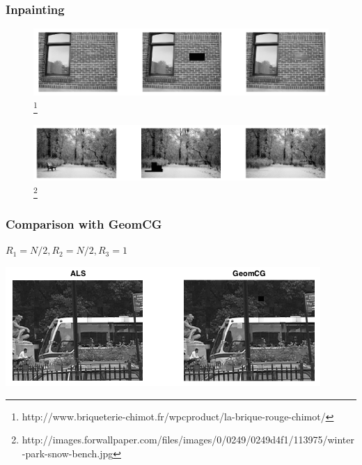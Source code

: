 \documentclass{beamer}
\begin{document}
\begin{frame}
\frametitle{Inpainting}
\begin{figure}
\includegraphics[width=1\linewidth]{InpaintingFacade.png}\footnote{\tiny{http://www.briqueterie-chimot.fr/wpcproduct/la-brique-rouge-chimot/}}
\end{figure}
\begin{figure}
\includegraphics[width=1\linewidth]{InpaintingSnow.png}\footnote{\tiny{http://images.forwallpaper.com/files/images/0/0249/0249d4f1/113975/winter-park-snow-bench.jpg}}
\end{figure}
\end{frame}

\begin{frame}
\frametitle{Comparison with GeomCG}
$R_1=N/2, R_2=N/2, R_3=1$\\
\begin{center}
\includegraphics[scale=0.5]{Compare1_2}
\end{center}
\end{frame}
\end{document}
